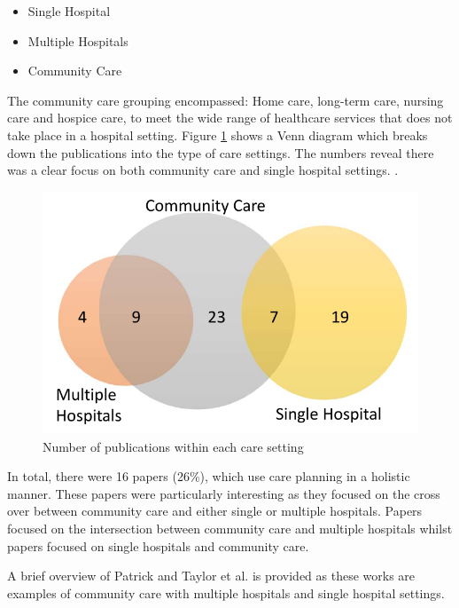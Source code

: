 \documentclass[../thesis.tex]{subfiles}
\begin{document}
\begin{itemize}
    \item Single Hospital
    \item Multiple Hospitals
    \item Community Care
\end{itemize}

The community care grouping encompassed: Home care, long-term care, nursing care and hospice care, to meet the wide range of healthcare services that does not take place in a hospital setting.
Figure \ref{fig:VennDiag} shows a Venn diagram which breaks down the publications into the type of care settings. The numbers reveal there was a clear focus on both community care and single hospital settings.
.

\begin{figure}[h!]
\centering
  \includegraphics[scale=0.75]{Chapter2/Figures/Venn2.pdf}
\caption{Number of publications within each care setting}
\label{fig:VennDiag}  
\end{figure}


In total, there were 16 papers (26\%), which use care planning in a holistic manner. These papers were particularly interesting as they focused on the cross over between community care and either single or multiple hospitals. Papers \cite{Davari, Intrevado, Johnson, Lim,McClean,Patrick,Ragab, Walker, Zychlinski} focused on the intersection between community care and multiple hospitals whilst papers \cite{Faddy,Garg1,Garg2, Gordon1,Gordon2, Hare, Taylor} focused on single hospitals and community care.

A brief overview of Patrick \cite{Patrick} and Taylor et al. \cite{Taylor} is provided as these works are examples of community care with multiple hospitals and single hospital settings. 
\end{document}
